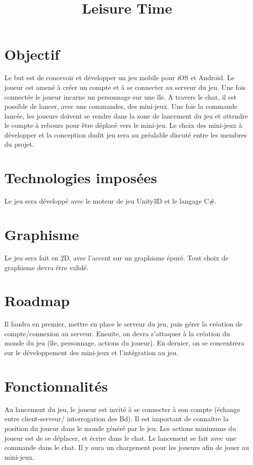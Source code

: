 \documentclass[]{article}
\title{Leisure Time}
\author{}
\begin{document}
\maketitle

\begin{abstract}

\end{abstract}

\section{Objectif}
Le but est de concevoir et développer un jeu mobile pour iOS et Android. Le joueur est amené à créer un compte et à se connecter au serveur du jeu. Une fois connectée le joueur incarne un personnage sur une île. A travers le chat, il est possible de lancer, avec une commandes, des mini-jeux. Une fois la commande lancée, les joueurs doivent se rendre dans la zone de lancement du jeu et attendre le compte à rebours pour être déplacé vers le mini-jeu. Le choix des mini-jeux à développer et la conception dudit jeu sera au préalable discuté entre les membres du projet.  

\section{Technologies imposées}
Le jeu sera développé avec le moteur de jeu Unity3D et le langage C\#.

\section{Graphisme}
Le jeu sera fait en 2D, avec l'accent sur un graphisme épuré. Tout choix de graphisme devra être validé.

\section{Roadmap}
Il faudra en premier, mettre en place le serveur du jeu, puis gérer la création de compte/connexion au serveur. Ensuite, on devra s'attaquer à la création du monde du jeu (île, personnage, actions du joueur). En dernier, on se concentrera sur le développement des mini-jeux et l'intégration au jeu.

\section{Fonctionnalités}
Au lancement du jeu, le joueur est invité à se connecter à son compte (échange entre client-serveur/ interrogation des Bd). Il est important de connaître la position du joueur dans le monde généré par le jeu. Les actions minimums du joueur est de se déplacer, et écrire dans le chat. Le lancement se fait avec une commande dans le chat. Il y aura un chargement pour les joueurs afin de jouer au mini-jeux.  
\end{document}
